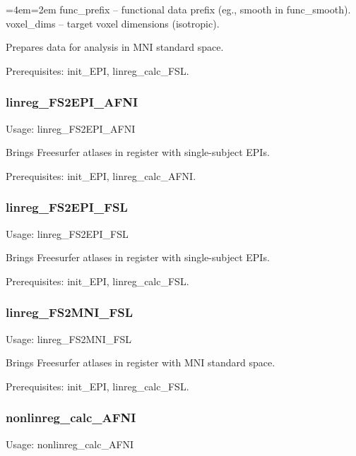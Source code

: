 \documentclass[final,titlepage,letterpaper,oneside,12pt]{article}
\renewcommand{\texttt}[2][BrickRed]{\textcolor{#1}{\ttfamily #2}}%
\newenvironment{blockquote}{%
  \par%
  \medskip
  \leftskip=4em\rightskip=2em%
  \noindent\ignorespaces}{%
  \par\medskip}
\begin{document}
\begin{blockquote}
func\_prefix -- functional data prefix (eg., smooth in func\_smooth). \\
voxel\_dims -- target voxel dimensions (isotropic). \
\end{blockquote}

\noindent Prepares data for analysis in MNI standard space.

Prerequisites: \texttt{init\_EPI}, \texttt{linreg\_calc\_FSL}.

\subsubsection{linreg\_FS2EPI\_AFNI}
Usage: \texttt{linreg\_FS2EPI\_AFNI}

\noindent Brings Freesurfer atlases in register with single-subject EPIs.

Prerequisites: \texttt{init\_EPI}, \texttt{linreg\_calc\_AFNI}.

\subsubsection{linreg\_FS2EPI\_FSL}
Usage: \texttt{linreg\_FS2EPI\_FSL}

\noindent Brings Freesurfer atlases in register with single-subject EPIs.

Prerequisites: \texttt{init\_EPI}, \texttt{linreg\_calc\_FSL}.

\subsubsection{linreg\_FS2MNI\_FSL}
Usage: \texttt{linreg\_FS2MNI\_FSL}

\noindent Brings Freesurfer atlases in register with MNI standard space.

Prerequisites: \texttt{init\_EPI}, \texttt{linreg\_calc\_FSL}.


\subsubsection{nonlinreg\_calc\_AFNI}
Usage: \texttt{nonlinreg\_calc\_AFNI}
\end{document}

